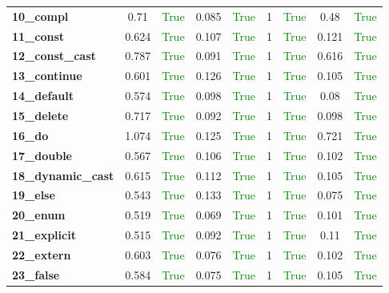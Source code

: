 \documentclass{article}
\begin{document}
\begin{xltabular}{\textwidth}{lcccccccc}
\textbf{10\_compl}& 0.71&\textcolor{green}{True}& 0.085&\textcolor{green}{True}& 1&\textcolor{green}{True}& 0.48&\textcolor{green}{True} \\[0.5ex]
\textbf{11\_const}& 0.624&\textcolor{green}{True}& 0.107&\textcolor{green}{True}& 1&\textcolor{green}{True}& 0.121&\textcolor{green}{True} \\[0.5ex]
\textbf{12\_const\_cast}& 0.787&\textcolor{green}{True}& 0.091&\textcolor{green}{True}& 1&\textcolor{green}{True}& 0.616&\textcolor{green}{True} \\[0.5ex]
\textbf{13\_continue}& 0.601&\textcolor{green}{True}& 0.126&\textcolor{green}{True}& 1&\textcolor{green}{True}& 0.105&\textcolor{green}{True} \\[0.5ex]
\textbf{14\_default}& 0.574&\textcolor{green}{True}& 0.098&\textcolor{green}{True}& 1&\textcolor{green}{True}& 0.08&\textcolor{green}{True} \\[0.5ex]
\textbf{15\_delete}& 0.717&\textcolor{green}{True}& 0.092&\textcolor{green}{True}& 1&\textcolor{green}{True}& 0.098&\textcolor{green}{True} \\[0.5ex]
\textbf{16\_do}& 1.074&\textcolor{green}{True}& 0.125&\textcolor{green}{True}& 1&\textcolor{green}{True}& 0.721&\textcolor{green}{True} \\[0.5ex]
\textbf{17\_double}& 0.567&\textcolor{green}{True}& 0.106&\textcolor{green}{True}& 1&\textcolor{green}{True}& 0.102&\textcolor{green}{True} \\[0.5ex]
\textbf{18\_dynamic\_cast}& 0.615&\textcolor{green}{True}& 0.112&\textcolor{green}{True}& 1&\textcolor{green}{True}& 0.105&\textcolor{green}{True} \\[0.5ex]
\textbf{19\_else}& 0.543&\textcolor{green}{True}& 0.133&\textcolor{green}{True}& 1&\textcolor{green}{True}& 0.075&\textcolor{green}{True} \\[0.5ex]
\textbf{20\_enum}& 0.519&\textcolor{green}{True}& 0.069&\textcolor{green}{True}& 1&\textcolor{green}{True}& 0.101&\textcolor{green}{True} \\[0.5ex]
\textbf{21\_explicit}& 0.515&\textcolor{green}{True}& 0.092&\textcolor{green}{True}& 1&\textcolor{green}{True}& 0.11&\textcolor{green}{True} \\[0.5ex]
\textbf{22\_extern}& 0.603&\textcolor{green}{True}& 0.076&\textcolor{green}{True}& 1&\textcolor{green}{True}& 0.102&\textcolor{green}{True} \\[0.5ex]
\textbf{23\_false}& 0.584&\textcolor{green}{True}& 0.075&\textcolor{green}{True}& 1&\textcolor{green}{True}& 0.105&\textcolor{green}{True} \\[0.5ex]

\end{xltabular}
\end{document}
